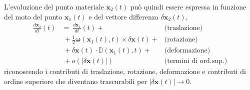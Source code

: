 %
 \noindent
L'evoluzione del punto materiale $\bm{x}_2(t)$ può quindi essere espressa in funzione del moto del punto $\bm{x}_1(t)$ e del vettore differenza $\delta\bm{x}_2(t)$,
\begin{equation}
\begin{aligned}
    \frac{d\bm{x}_2}{d t}(t) & = \ \frac{d\bm{x}_1}{d t}(t) + & \text{(traslazione)} \\
    & \ + \frac{1}{2} \bm{\omega}(\bm{x}_1(t),t) \times \delta \bm{x}(t) + & \text{(rotazione)} \\
    & \ + \delta \bm{x}(t) \cdot \mathbb{D}(\bm{x}_1(t),t) + & \text{(deformazione)} \\
    & \ + o(|\delta\bm{x}(t)|) & \text{(termini di ord.sup.)}
\end{aligned}
\end{equation}
riconoscendo i contributi di traslazione, rotazione, deformazione e contributi di ordine superiore che diventano trascurabili per $|\delta\bm{x}(t)| \rightarrow 0$.


